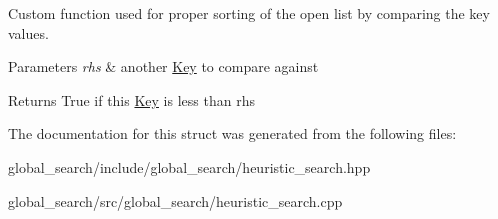 Custom function used for proper sorting of the open list by comparing the key values. 


\begin{DoxyParams}{Parameters}
{\em rhs} & another \hyperlink{structhsearch_1_1Key}{Key} to compare against \\
\hline
\end{DoxyParams}
\begin{DoxyReturn}{Returns}
True if this \hyperlink{structhsearch_1_1Key}{Key} is less than rhs 
\end{DoxyReturn}


The documentation for this struct was generated from the following files\+:\begin{DoxyCompactItemize}
\item 
global\+\_\+search/include/global\+\_\+search/heuristic\+\_\+search.\+hpp\item 
global\+\_\+search/src/global\+\_\+search/heuristic\+\_\+search.\+cpp\end{DoxyCompactItemize}
